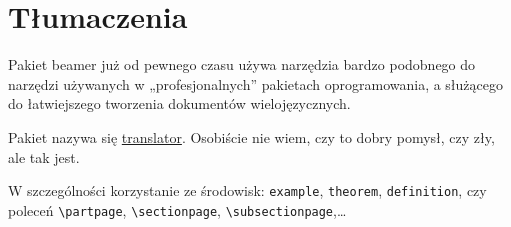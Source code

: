 %

\section{Tłumaczenia}

Pakiet beamer już od pewnego czasu używa narzędzia bardzo podobnego do narzędzi używanych w „profesjonalnych” pakietach oprogramowania, a służącego do łatwiejszego tworzenia dokumentów wielojęzycznych.

Pakiet nazywa się \href{https://ctan.org/pkg/translator}{translator}. Osobiście nie wiem, czy to dobry pomysł, czy zły, ale tak jest.

W szczególności korzystanie ze środowisk: \lstinline|example|, \lstinline|theorem|, \lstinline|definition|, czy poleceń \lstinline|\partpage|, \lstinline|\sectionpage|, \lstinline|\subsectionpage|,…

%
%
%
%
%
%
%
%


